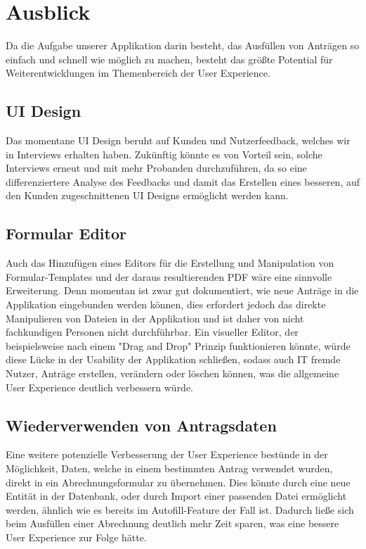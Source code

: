 \chapter{Ausblick}\label{ch:ausblick}

Da die Aufgabe unserer Applikation darin besteht, das Ausfüllen von Anträgen so einfach 
und schnell wie möglich zu machen, besteht das größte Potential für Weiterentwicklungen
im Themenbereich der User Experience.

\section{\ac{UI} Design}\label{sec: ui design}
Das momentane \ac{UI} Design beruht auf Kunden und Nutzerfeedback, welches wir in
Interviews erhalten haben. Zukünftig könnte es von Vorteil sein, solche Interviews
erneut und mit mehr Probanden durchzuführen, da so eine differenziertere Analyse
des Feedbacks und damit das Erstellen eines besseren, auf den Kunden zugeschnittenen \ac{UI}
Designs ermöglicht werden kann.

\section{Formular Editor}\label{sec: formular editor}
Auch das Hinzufügen eines Editors für die Erstellung und Manipulation von 
Formular-Templates und der daraus resultierenden PDF wäre eine sinnvolle Erweiterung. Denn 
momentan ist zwar gut dokumentiert, wie neue Anträge in die Applikation eingebunden werden 
können, dies erfordert jedoch das direkte Manipulieren von Dateien in der Applikation 
und ist daher von nicht fachkundigen Personen nicht durchführbar. Ein visueller Editor, der 
beispielsweise nach einem "Drag and Drop" Prinzip funktionieren könnte, würde diese Lücke 
in der Usability der Applikation schließen, sodass auch IT fremde Nutzer, Anträge 
erstellen, verändern oder löschen können, was die allgemeine User Experience deutlich 
verbessern würde.

\section{Wiederverwenden von Antragsdaten}\label{sec: wiederverwenden von Antragsdaten}
Eine weitere potenzielle Verbesserung der User Experience bestünde in der Möglichkeit, 
Daten, welche in einem bestimmten Antrag verwendet wurden, direkt in ein 
Abrechnungsformular zu übernehmen. Dies könnte durch eine neue Entität in der Datenbank, 
oder durch Import einer passenden Datei ermöglicht werden, ähnlich wie es bereits im 
Autofill-Feature der Fall ist. Dadurch ließe sich beim Ausfüllen einer Abrechnung deutlich 
mehr Zeit sparen, was eine bessere User Experience zur Folge hätte.

